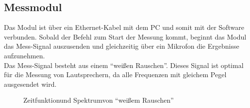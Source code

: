 \newpage
\subsection*{Messmodul}\label{subsec:5.2.2}
Das Modul ist über ein Ethernet-Kabel mit dem PC und somit mit der Software verbunden. Sobald der Befehl zum Start der Messung kommt, beginnt das Modul das Mess-Signal auszusenden und gleichzeitig über ein Mikrofon die Ergebnisse aufzunehmen.\\
Das Mess-Signal besteht aus einem \enquote{weißen Rauschen}. Dieses Signal ist optimal für die Messung von Lautsprechern, da alle Frequenzen mit gleichem Pegel ausgesendet wird.
\begin{figure} [H]
	\centering
	\caption[Zeitfunktion und Spektrum von \enquote{weißem Rauschen}]{Zeitfunktion\footnotemark und Spektrum\footnotemark von \enquote{weißem Rauschen}}
	\label{fig:5.2.2.1}
\end{figure}
